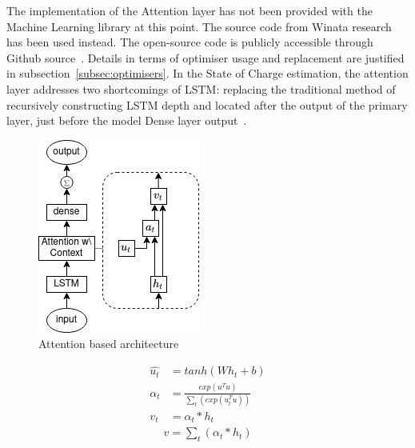 %
The implementation of the Attention layer has not been provided with the Machine Learning library at this point.
The source code from Winata research~\cite{winata_attention-based_2018} has been used instead.
The open-source code is publicly accessible through Github source~\cite{attention_8461990}.
Details in terms of optimiser usage and replacement are justified in subsection~\ref{subsec:optimisers}.
In the State of Charge estimation, the attention layer addresses two shortcomings of LSTM: replacing the traditional method of recursively constructing LSTM depth and located after the output of the primary layer, just before the model Dense layer output~\cite{mamo_long_2020}.
\begin{figure}[htbp]
    \centering
    \includegraphics[width=0.35\linewidth]{II_Body/LSTM/images/AttenrionDrawing.jpg}
    \caption{Attention based architecture}
    \label{fig:attention}
\end{figure}
\begin{equation}
    \begin{split}
        \hat{u_t} &= tanh \left(W h_{t} + b \right) \\
             \alpha_t &= \frac{exp(u^T u)}{\sum_t(exp(u_t^T u))} \\
              v_t &= \alpha_t*h_t%
    \end{split}
    \label{eq:AttentionWithContext}
\end{equation}
\begin{equation}
    \begin{split}
        v = \sum_t(\alpha_t * h_t)
    \end{split}
    \label{eq:Addition}
\end{equation}
%
